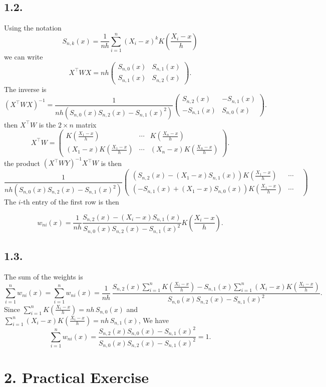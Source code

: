 \documentclass[11pt]{article}
\begin{document}
\subsection*{1.2.}
Using the notation
\[S_{n,k}(x) = \frac{1}{nh} \sum_{i=1}^n (X_i - x)^k K\left(\frac{X_i-x}{h}\right)\]
we can write 
\[X^{\top}WX = nh \begin{pmatrix}
S_{n,0}(x) & S_{n,1}(x)\\
S_{n,1}(x) & S_{n,2}(x)
\end{pmatrix}.\]
The inverse is
\[(X^{\top}WX)^{-1} = \frac{1}{nh(S_{n,0}(x)S_{n,2}(x)-S_{n,1}(x)^2)}
\begin{pmatrix}
S_{n,2}(x) & -S_{n,1}(x)\\
-S_{n,1}(x) & S_{n,0}(x)
\end{pmatrix}.\]
then 
\(X^{\top}W\) is the \(2\times n\) matrix
\[
X^{\top}W=
\begin{pmatrix}
K\left(\frac{X_1-x}{h}\right) & \cdots & K\!\left(\frac{X_n-x}{h}\right)\\
(X_1-x)K\left(\frac{X_1-x}{h}\right) & \cdots & (X_n-x)K\left(\frac{X_n-x}{h}\right)
\end{pmatrix}.
\]
the product \((X^{\top}WY)^{-1}X^{\top}W\) is then
\[
\frac{1}{nh(S_{n,0}(x)S_{n,2}(x)-S_{n,1}(x)^2)}
\begin{pmatrix}
(S_{n,2}(x) - (X_1 - x) S_{n,1}(x))K\left(\frac{X_1-x}{h}\right) & \cdots & \\
(-S_{n,1}(x) + (X_1 - x) S_{n,0}(x))K\left(\frac{X_1-x}{h}\right) & \cdots &
\end{pmatrix}
\]
The \(i\)-th entry of the first row is then

\[
w_{ni}(x) = \frac{1}{nh}\frac{S_{n,2}(x) - (X_i - x) S_{n,1}(x)}{S_{n,0}(x)S_{n,2}(x)-S_{n,1}(x)^2} K\left(\frac{X_i-x}{h}\right).
\]

\subsection*{1.3.}
The sum of the weights is
\[\sum_{i=1}^n w_{ni}(x) =
\sum_{i=1}^n w_{ni}(x)
=\frac{1}{nh}\,
\frac{S_{n,2}(x)\sum_{i=1}^n K\left(\frac{X_i-x}{h}\right)
- S_{n,1}(x)\sum_{i=1}^n (X_i-x)K\left(\frac{X_i-x}{h}\right)}
{S_{n,0}(x)S_{n,2}(x)-S_{n,1}(x)^2}.
\]
Since \(\sum_{i=1}^n K\left(\frac{X_i-x}{h}\right)=nh\,S_{n,0}(x)\) and
\(\sum_{i=1}^n (X_i-x)K\left(\frac{X_i-x}{h}\right)=nh\,S_{n,1}(x)\),
We have 
\[\sum_{i=1}^n w_{ni}(x) =
\frac{S_{n,2}(x)S_{n,0}(x)-S_{n,1}(x)^2}
{S_{n,0}(x)S_{n,2}(x)-S_{n,1}(x)^2}=1.\]    

\section*{2. Practical Exercise}
\end{document}
